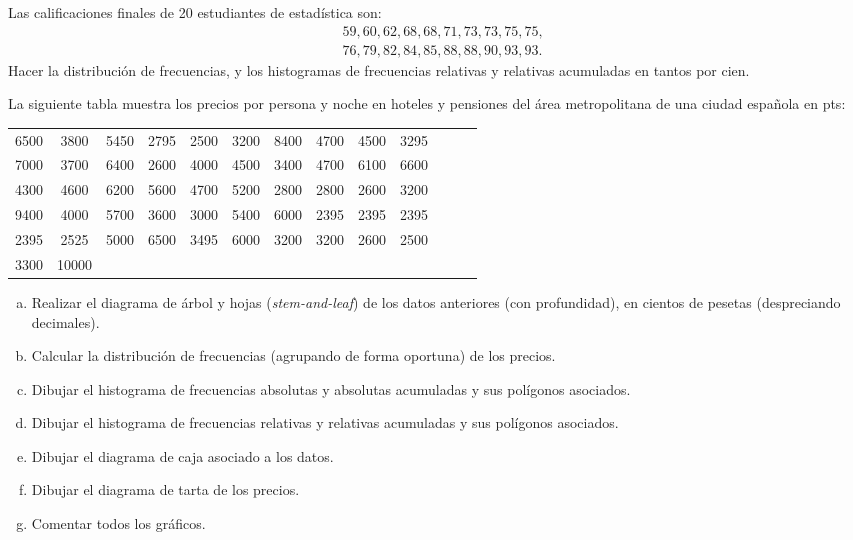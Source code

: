 \documentclass[12pt]{article}
\begin{document}
\begin{prob}Las calificaciones finales  de 20
estudiantes de estadística son:
$$
\begin{array}{ll}&59,
60, 62, 68, 68, 71, 73, 73, 75, 75,\\ & 76, 79, 82, 84, 85, 88, 88, 90, 93, 93.
\end{array}
$$
Hacer la distribución de frecuencias, y los histogramas de frecuencias relativas y
relativas acumuladas en tantos por cien.
\end{prob}


\begin{prob}
La siguiente tabla muestra los precios por persona y noche en hoteles
 y pensiones del área metropolitana de una ciudad española en pts:


\begin{tabular}{ccccccccccccc}
6500 & 3800 & 5450 & 2795 & 2500 & 3200 & 8400 & 4700 & 4500 & 3295 \\ 7000 & 3700 & 6400
& 2600 & 4000 & 4500 & 3400 & 4700 & 6100 & 6600 \\ 4300 & 4600 & 6200 & 5600 & 4700 &
5200 & 2800 & 2800 & 2600 & 3200 \\ 9400 & 4000 & 5700 & 3600 & 3000 & 5400 & 6000 & 2395
& 2395 & 2395 \\ 2395 & 2525 & 5000 & 6500 & 3495 & 6000 & 3200 & 3200 & 2600 & 2500 \\
3300 & 10000
\end{tabular}


\begin{enumerate}[a)]
\item Realizar el diagrama de árbol y hojas
(\textit{stem-and-leaf}) de los datos anteriores (con profundidad), en cientos de pesetas
(despreciando decimales).
\item Calcular la distribución de frecuencias (agrupando de forma
oportuna) de los precios.
\item Dibujar el histograma de frecuencias absolutas y absolutas
acumuladas y sus polígonos asociados.
\item Dibujar el histograma de frecuencias relativas  y relativas
acumuladas y sus polígonos asociados.
\item Dibujar el diagrama de caja asociado a los datos.
\item Dibujar el diagrama de tarta de los precios.
\item Comentar todos los gráficos.
\end{enumerate}
\end{prob}
\end{document}
